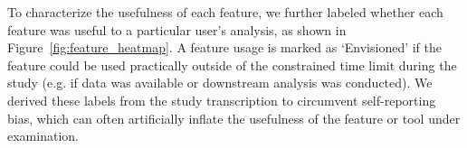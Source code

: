 To characterize the usefulness of each feature, we further labeled whether each feature was useful to a particular user's analysis, as shown in Figure~\ref{fig:feature_heatmap}. A feature usage is marked as `Envisioned' if the feature could be used practically outside of the constrained time limit during the study (e.g. if data was available or downstream analysis was conducted).
We derived these labels from the study transcription to circumvent self-reporting bias, which can often artificially inflate the usefulness of the feature or tool under examination.
